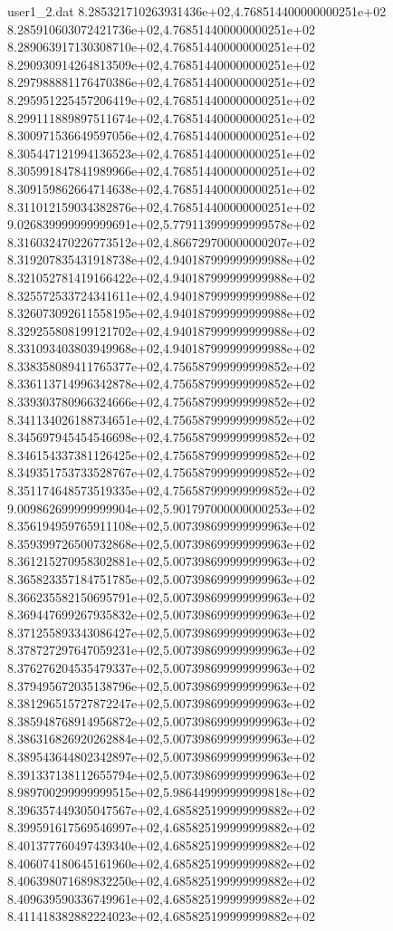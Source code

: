 \begin{filecontents}{user1_2.dat}
8.285321710263931436e+02,4.768514400000000251e+02
8.285910603072421736e+02,4.768514400000000251e+02
8.289063917130308710e+02,4.768514400000000251e+02
8.290930914264813509e+02,4.768514400000000251e+02
8.297988881176470386e+02,4.768514400000000251e+02
8.295951225457206419e+02,4.768514400000000251e+02
8.299111889897511674e+02,4.768514400000000251e+02
8.300971536649597056e+02,4.768514400000000251e+02
8.305447121994136523e+02,4.768514400000000251e+02
8.305991847841989966e+02,4.768514400000000251e+02
8.309159862664714638e+02,4.768514400000000251e+02
8.311012159034382876e+02,4.768514400000000251e+02
9.026839999999999691e+02,5.779113999999999578e+02
8.316032470226773512e+02,4.866729700000000207e+02
8.319207835431918738e+02,4.940187999999999988e+02
8.321052781419166422e+02,4.940187999999999988e+02
8.325572533724341611e+02,4.940187999999999988e+02
8.326073092611558195e+02,4.940187999999999988e+02
8.329255808199121702e+02,4.940187999999999988e+02
8.331093403803949968e+02,4.940187999999999988e+02
8.338358089411765377e+02,4.756587999999999852e+02
8.336113714996342878e+02,4.756587999999999852e+02
8.339303780966324666e+02,4.756587999999999852e+02
8.341134026188734651e+02,4.756587999999999852e+02
8.345697945454546698e+02,4.756587999999999852e+02
8.346154337381126425e+02,4.756587999999999852e+02
8.349351753733528767e+02,4.756587999999999852e+02
8.351174648573519335e+02,4.756587999999999852e+02
9.009862699999999904e+02,5.901797000000000253e+02
8.356194959765911108e+02,5.007398699999999963e+02
8.359399726500732868e+02,5.007398699999999963e+02
8.361215270958302881e+02,5.007398699999999963e+02
8.365823357184751785e+02,5.007398699999999963e+02
8.366235582150695791e+02,5.007398699999999963e+02
8.369447699267935832e+02,5.007398699999999963e+02
8.371255893343086427e+02,5.007398699999999963e+02
8.378727297647059231e+02,5.007398699999999963e+02
8.376276204535479337e+02,5.007398699999999963e+02
8.379495672035138796e+02,5.007398699999999963e+02
8.381296515727872247e+02,5.007398699999999963e+02
8.385948768914956872e+02,5.007398699999999963e+02
8.386316826920262884e+02,5.007398699999999963e+02
8.389543644802342897e+02,5.007398699999999963e+02
8.391337138112655794e+02,5.007398699999999963e+02
8.989700299999999515e+02,5.986449999999999818e+02
8.396357449305047567e+02,4.685825199999999882e+02
8.399591617569546997e+02,4.685825199999999882e+02
8.401377760497439340e+02,4.685825199999999882e+02
8.406074180645161960e+02,4.685825199999999882e+02
8.406398071689832250e+02,4.685825199999999882e+02
8.409639590336749961e+02,4.685825199999999882e+02
8.411418382882224023e+02,4.685825199999999882e+02

\end{filecontents}
